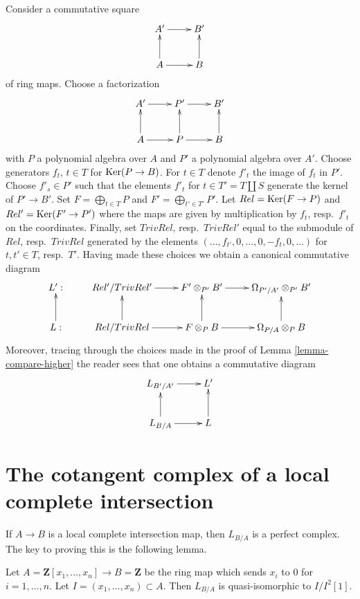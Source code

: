 \begin{remark}
\label{remark-functoriality-lichtenbaum-schlessinger}
Consider a commutative square
$$
\xymatrix{
A' \ar[r] & B' \\
A \ar[u] \ar[r] & B \ar[u]
}
$$
of ring maps. Choose a factorization
$$
\xymatrix{
A' \ar[r] & P' \ar[r] & B' \\
A \ar[u] \ar[r] & P \ar[u] \ar[r] & B \ar[u]
}
$$
with $P$ a polynomial algebra over $A$ and $P'$ a polynomial algebra over $A'$.
Choose generators $f_t$, $t \in T$ for $\mathop{\mathrm{Ker}}(P \to B)$.
For $t \in T$ denote $f'_t$ the image of $f_t$ in $P'$.
Choose $f'_s \in P'$ such that the elements $f'_t$ for
$t \in T' = T \amalg S$ generate the kernel
of $P' \to B'$. Set $F = \bigoplus_{t \in T} P$ and
$F' = \bigoplus_{t' \in T'} P'$. Let $Rel = \mathop{\mathrm{Ker}}(F \to P)$
and $Rel' = \mathop{\mathrm{Ker}}(F' \to P')$ where the maps are given
by multiplication by $f_t$, resp.\ $f'_t$ on the coordinates.
Finally, set $TrivRel$, resp.\ $TrivRel'$ equal to the submodule
of $Rel$, resp.\ $TrivRel$ generated by the elements
$(\ldots, f_{t'}, 0, \ldots, 0, -f_t, 0, \ldots)$
for $t, t' \in T$, resp.\ $T'$. Having made these choices we obtain a
canonical commutative diagram
$$
\xymatrix{
L' : &
Rel'/TrivRel' \ar[r] &
F' \otimes_{P'} B' \ar[r] &
\Omega_{P'/A'} \otimes_{P'} B' \\
L : \ar[u] &
Rel/TrivRel \ar[r] \ar[u] &
F \otimes_P B \ar[r] \ar[u] &
\Omega_{P/A} \otimes_P B \ar[u]
}
$$
Moreover, tracing through the choices made in the proof of
Lemma \ref{lemma-compare-higher}
the reader sees that one obtains a commutative diagram
$$
\xymatrix{
L_{B'/A'} \ar[r] & L' \\
L_{B/A} \ar[r] \ar[u] & L \ar[u]
}
$$
\end{remark}





\section{The cotangent complex of a local complete intersection}
\label{section-lci}

\noindent
If $A \to B$ is a local complete intersection map, then
$L_{B/A}$ is a perfect complex. The key to proving this is
the following lemma.

\begin{lemma}
\label{lemma-special-case}
Let $A = \mathbf{Z}[x_1, \ldots, x_n] \to B = \mathbf{Z}$
be the ring map which sends $x_i$ to $0$ for $i = 1, \ldots, n$.
Let $I = (x_1, \ldots, x_n) \subset A$. Then $L_{B/A}$ is quasi-isomorphic to
$I/I^2[1]$.
\end{lemma}


